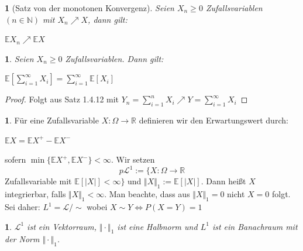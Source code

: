 \documentclass[10pt,a4paper]{report}
\numberwithin{equation}{section}
\numberwithin{figure}{section}
\theoremstyle{plain}
\theoremstyle{definition}
\newtheorem{defn}[thm]{\protect\definitionname}
\theoremstyle{remark}
\theoremstyle{plain}
\newtheorem{prop}[thm]{\protect\propositionname}
\newtheorem{cor}[thm]{\protect\corollaryname}
\providecommand{\corollaryname}{Korollar}
\providecommand{\definitionname}{Definition}
\providecommand{\propositionname}{Satz}
\newcommand{\1}{ \mathbb{1} } %
\begin{document}
\begin{prop}[Satz von der monotonen Konvergenz]
  Seien $X_n\geq 0$ Zufallsvariablen $(n \in \mathbb{N})$ mit $X_n \nearrow X$,
  dann gilt:
  \begin{center}
    $\mathbb{E}X_n \nearrow \mathbb{E}X$
  \end{center}
\end{prop}
\begin{cor} %
  Seien $X_n \geq 0$ Zufallsvariablen. Dann gilt:
  \begin{center}
    $\mathbb{E}[\sum\limits_{i=1}^\infty
    X_i]=\sum\limits_{i=1}^\infty\mathbb{E}[X_i]$
  \end{center}
\end{cor}
\begin{proof}
  Folgt aus Satz 1.4.12 mit $Y_n=\sum\limits_{i=1}^nX_i \nearrow Y= \sum\limits_{i=1}^\infty X_i$ 
\end{proof}
\begin{defn}  %
  Für eine Zufallsvariable $X:\Omega \to \mathbb{R}$ definieren wir den
  Erwartungswert durch:
  \begin{center}
    $\mathbb{E}X=\mathbb{E}X^+-\mathbb{E}X^-$
  \end{center}
  sofern $\min\{\mathbb{E}X^+,\mathbb{E}X^-\}<\infty$.
  Wir setzen
  \[p\mathcal{L}^1:=\{X:\Omega \to \mathbb{R}\] Zufallsvariable mit $\mathbb{E}[|X|]< \infty \}$
  und $\Vert X\Vert_1:=\mathbb{E}[|X|]$. Dann heißt $X$ integrierbar, falls $\Vert X \Vert_1 < \infty$.
  Man beachte, dass aus $\Vert X \Vert_1=0$ nicht $X=0$ folgt. Sei daher:
  $L^1=\mathcal{L}/\sim$ wobei $X\sim Y \Leftrightarrow P(X=Y)=1$
\end{defn} %
\begin{prop}
  $\mathcal{L}^1$ ist ein Vektorraum, $\Vert \cdot \Vert_1$ ist eine Halbnorm und $L^1$ ist ein Banachraum mit der Norm $\Vert \cdot \Vert_1$.
\end{prop}
\end{document}
